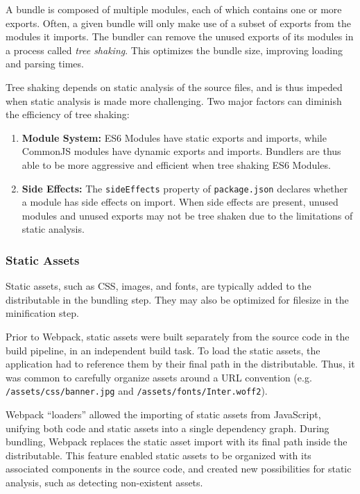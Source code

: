 \documentclass{article}
\begin{document}
A bundle is composed of multiple modules, each of which contains one or more exports. Often, a given
bundle will only make use of a subset of exports from the modules it imports. The bundler can remove
the unused exports of its modules in a process called \textit{tree shaking}. This optimizes the
bundle size, improving loading and parsing times.

Tree shaking depends on static analysis of the source files, and is thus impeded when static
analysis is made more challenging. Two major factors can diminish the efficiency of tree shaking:

\begin{enumerate}
  \item \textbf{Module System:} ES6 Modules have static exports and imports, while CommonJS modules
    have dynamic exports and imports. Bundlers are thus able to be more aggressive and efficient
    when tree shaking ES6 Modules.

  \item \textbf{Side Effects:} The \texttt{sideEffects} property of \texttt{package.json} declares
    whether a module has side effects on import. When side effects are present, unused modules and
    unused exports may not be tree shaken due to the limitations of static analysis.
\end{enumerate}

\subsubsection{Static Assets}

Static assets, such as CSS, images, and fonts, are typically added to the distributable in the
bundling step. They may also be optimized for filesize in the minification step.

Prior to Webpack, static assets were built separately from the source code in the build pipeline, in
an independent build task. To load the static assets, the application had to reference them by their
final path in the distributable. Thus, it was common to carefully organize assets around a URL
convention (e.g. \texttt{/assets/css/banner.jpg} and \texttt{/assets/fonts/Inter.woff2}).

Webpack ``loaders'' allowed the importing of static assets from JavaScript, unifying both code and
static assets into a single dependency graph. During bundling, Webpack replaces the static asset
import with its final path inside the distributable. This feature enabled static assets to be
organized with its associated components in the source code, and created new possibilities for
static analysis, such as detecting non-existent assets.
\end{document}
